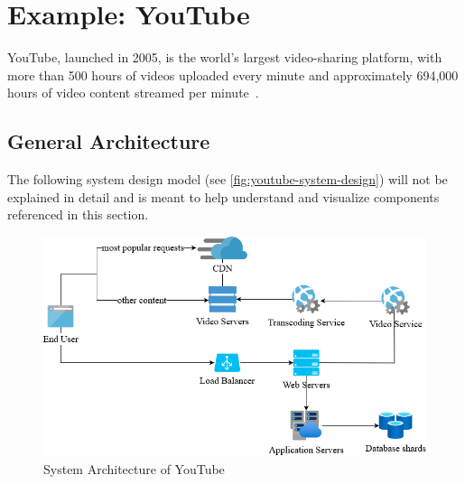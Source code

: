 \section{Example: YouTube}

YouTube, launched in 2005, is the world's largest video-sharing platform, with more than 500 hours of videos uploaded every minute and approximately 694,000 hours of video content streamed per minute~\parencite{youtube_stats}.

\subsection{General Architecture}

The following system design model (see \autoref{fig:youtube-system-design}) will not be explained in detail and is meant to help understand and visualize components referenced in this section.

\begin{figure}[htpb]
    \centering
    \includegraphics[width=350pt]{images/YoutubeSystemArchitecture.png}
    \caption[System Architecture of YouTube]{System Architecture of YouTube}\label{fig:youtube-system-design}
\end{figure}

